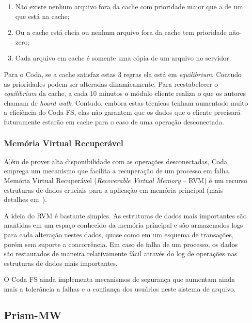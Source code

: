 \begin{enumerate}
	\item Não existe nenhum arquivo fora da cache com prioridade maior que a de um que está na cache;
	\item Ou a cache está cheia ou nenhum arquivo fora da cache tem prioridade não-zero;
	\item Cada arquivo em cache é somente uma cópia de um arquivo no servidor.
\end{enumerate}

Para o Coda, se a cache satisfaz estas 3 regras ela está em \emph{equilibrium}. Contudo as prioridades podem ser alteradas dinamicamente. Para reestabelecer o \emph{equilibrium} da cache, a cada 10 minutos o módulo cliente realiza o que os autores chamam de \emph{hoard walk}. Contudo, embora estas técnicas tenham aumentado muito a eficiência do Coda FS, elas não garantem que os dados que o cliente precisará futuramente estarão em cache para o caso de uma operação desconectada.

\subsubsection*{Memória Virtual Recuperável}
Além de prover alta disponibilidade com as operações desconectadas, Coda emprega um mecanismo que facilita a recuperação de um processo em falha. Memória Virtual Recuperável (\emph{Recoverable Virtual Memory} -- RVM) é um recurso estruturas de dados cruciais para a aplicação em memória principal (mais detalhes em~\cite{satyanarayanan1994lightweight}).

A ideia do RVM é bastante simples. As estruturas de dados mais importantes são mantidas em um espaço conhecido da memória principal e são armazenados logs para cada alteração nestes dados, quase como em um esquema de transações, porém sem suporte a concorrência. Em caso de falha de um processo, os dados são restaurados de maneira relativamente fácil através do log de operações nas estruturas de dados mais importantes.

O Coda FS ainda implementa mecanismos de segurança que aumentam ainda mais a tolerância a falhas e a confiança dos usuários neste sistema de arquivo.


\subsection{Prism-MW} %
\label{sub:prism_mw}

